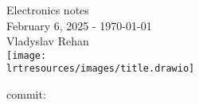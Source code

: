 





\begin{titlepage}
	\vspace*{\fill}
	\begin{center}
		\Huge
		Electronics notes\\
		\vspace{1cm}
		\Large
		February 6, 2025 - \today\\
		\large
		Vladyslav Rehan\\
		\vspace*{4cm}
		\texttt{[image: \\lrtresources/images/title.drawio]}
		\vspace*{5cm}
	\end{center}
	\vspace*{\fill}
	\begin{raggedleft}
		commit: \href{\elnthomepage}{\texttt{\elntcommithash}}
	\end{raggedleft}
\end{titlepage}

\tableofcontents





\printbibliography


